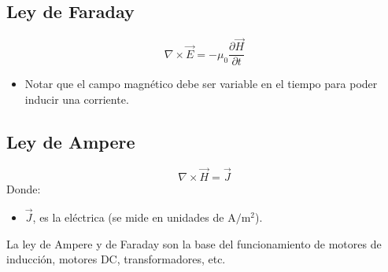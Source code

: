 \documentclass[letterpaper,10pt,english]{jupyterBook}
\begin{document}
\subsection{Ley de Faraday}
\label{\detokenize{1_ondas_electromagneticas/1_ondas_electromagneticas:ley-de-faraday}}
\sphinxAtStartPar
{}
\label{equation:1_ondas_electromagneticas/1_ondas_electromagneticas:2324d2fb-0dce-425d-aa9f-032560abfe02}\begin{equation}
\nabla\times\vec{E} = -\mu_0\frac{\partial \vec{H}}{\partial t}
\end{equation}\begin{itemize}
\item {} 
\sphinxAtStartPar
Notar que el campo magnético debe ser variable en el tiempo para poder inducir una corriente.

\end{itemize}


\subsection{Ley de Ampere}
\label{\detokenize{1_ondas_electromagneticas/1_ondas_electromagneticas:ley-de-ampere}}
\sphinxAtStartPar
{}
\label{equation:1_ondas_electromagneticas/1_ondas_electromagneticas:0b577b82-cc79-45b7-9c98-a41cd6ae3f38}\begin{equation}
\nabla\times\vec{H} = \vec{J}
\end{equation}
\sphinxAtStartPar
Donde:
\begin{itemize}
\item {} 
\sphinxAtStartPar
\(\vec{J}\), es la   eléctrica (se mide en unidades de \(\mathrm{A/m^2}\)).

\end{itemize}

\sphinxAtStartPar
La ley de Ampere y de Faraday son la base del funcionamiento de motores de inducción, motores DC, transformadores, etc.
\end{document}

